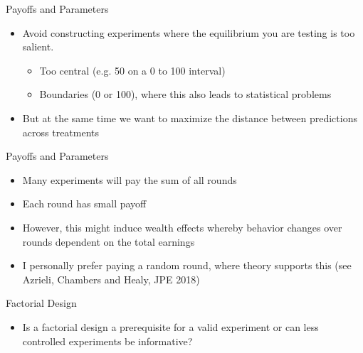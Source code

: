 \documentclass{beamer}
\begin{document}
\begin{frame}{Payoffs and Parameters}
	\begin{itemize}
		\item Avoid constructing experiments where the equilibrium you are testing is too salient.
		\begin{itemize}
			\item Too central (e.g. 50 on a 0 to 100 interval)
			\item Boundaries (0 or 100), where this also leads to statistical problems
		\end{itemize}
	\item But at the same time we want to maximize the distance between predictions across treatments
	\end{itemize}
\end{frame}

\begin{frame}{Payoffs and Parameters}
	\begin{itemize}
		\item Many experiments will pay the sum of all rounds
		\item Each round has small payoff
		\item However, this might induce wealth effects whereby behavior changes over rounds dependent on the total earnings
		\pause
		\item I personally prefer paying a random round, where theory supports this (see Azrieli, Chambers and Healy, JPE 2018)
	\end{itemize}
\end{frame}

\begin{frame}{Factorial Design}
	\begin{itemize}
		\item Is a factorial design a prerequisite for a valid experiment or can less controlled experiments be informative?
	\end{itemize}
\end{frame}
\end{document}
